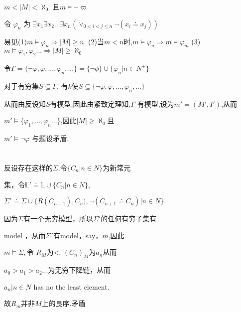 \documentclass{article}
\begin{document}
\begin{CJK*}{UTF8}{gbsn}
$m <|M| < \aleph_0$ 且$m\vDash \neg  \varpi $

令 $\varphi_n$ 为 $\exists x_1 \exists x_2 ... \exists x_n (\vee_{0<i<j\leq n}\neg (x_i \doteq x_j))$

易见(1)$ m\vDash \varphi_n \Rightarrow |M|\geq n$. (2)当$m<n$时,$m\vDash \varphi_n \Rightarrow m\vDash \varphi_m$ 
(3)$m\vDash {\varphi_1,\varphi_2...} \Rightarrow |M|\geq \aleph_0$

令$\Gamma =\{ \neg  \varphi, \varphi, ..., \varphi_n ,...\} = \{ \neg \phi \}\cup \{\varphi_n |n \in N^+\}$

对于有穷集$S \subseteq \Gamma$, 有$k$使$S\subseteq \{ \neg  \varphi, \varphi, ..., \varphi_n ,...\} $

从而由反设知$S$有模型,因此由紧致定理知,$\Gamma$ 有模型,设为$m' = (M',I')$,从而

$m'\vDash \{\varphi_1, ..., \varphi_n...\}$,因此$|M|\geq \aleph_0$且

$m' \vDash \neg \varphi$ 与题设矛盾.


\section{}

反设存在这样的$\Sigma$.令$\{C_n|n \in N\}$为新常元

集，令$\mathbb{L'}\doteq \mathbb{L} \cup \{C_n | n \in N\}$,

$\Sigma' \doteq \Sigma \cup \{R (C_{n+1}),C_n),\neg (C_{n+1}\doteq C_n)| n\in N\}$


因为$\Sigma$有一个无穷模型，所以$\Sigma'$的任何有穷子集有

model ，从而$\Sigma'$有model，say，$m$,因此

$m \vDash \Sigma,$令 $R_M$为<, $(C_n)_M$为$a_n$从而

$a_0>a_1>a_2...$为无穷下降链，从而

${a_n | n \in N}$ has no the least element.

故$R_m$并非$M$上的良序.矛盾




\end{CJK*}

\begin{CJK*}{UTF8}{bsmi}
\end{CJK*}
\end{document}
